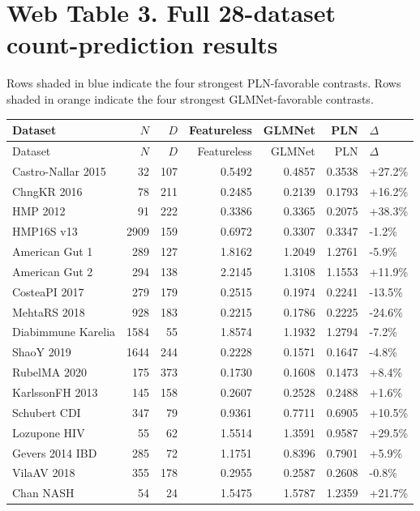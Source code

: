 \documentclass[11pt]{article}
\begin{document}
\section*{Web Table 3. Full 28-dataset count-prediction results}
Rows shaded in blue indicate the four strongest PLN-favorable contrasts.
Rows shaded in orange indicate the four strongest GLMNet-favorable contrasts.
\small
\begin{longtable}{p{}rrrrrp{}}
\toprule
Dataset & $N$ & $D$ & Featureless & GLMNet & PLN & $\Delta$ \\
\midrule
\endfirsthead
\toprule
Dataset & $N$ & $D$ & Featureless & GLMNet & PLN & $\Delta$ \\
\midrule
\endhead
Castro-Nallar 2015 & 32 & 107 & 0.5492 & 0.4857 & 0.3538 & +27.2\% \\
ChngKR 2016 & 78 & 211 & 0.2485 & 0.2139 & 0.1793 & +16.2\% \\
\rowcolor{blue!8} HMP 2012 & 91 & 222 & 0.3386 & 0.3365 & 0.2075 & +38.3\% \\
HMP16S v13 & 2909 & 159 & 0.6972 & 0.3307 & 0.3347 & -1.2\% \\
American Gut 1 & 289 & 127 & 1.8162 & 1.2049 & 1.2761 & -5.9\% \\
American Gut 2 & 294 & 138 & 2.2145 & 1.3108 & 1.1553 & +11.9\% \\
\rowcolor{orange!10} CosteaPI 2017 & 279 & 179 & 0.2515 & 0.1974 & 0.2241 & -13.5\% \\
\rowcolor{orange!10} MehtaRS 2018 & 928 & 183 & 0.2215 & 0.1786 & 0.2225 & -24.6\% \\
\rowcolor{orange!10} Diabimmune Karelia & 1584 & 55 & 1.8574 & 1.1932 & 1.2794 & -7.2\% \\
ShaoY 2019 & 1644 & 244 & 0.2228 & 0.1571 & 0.1647 & -4.8\% \\
RubelMA 2020 & 175 & 373 & 0.1730 & 0.1608 & 0.1473 & +8.4\% \\
KarlssonFH 2013 & 145 & 158 & 0.2607 & 0.2528 & 0.2488 & +1.6\% \\
Schubert CDI & 347 & 79 & 0.9361 & 0.7711 & 0.6905 & +10.5\% \\
\rowcolor{blue!8} Lozupone HIV & 55 & 62 & 1.5514 & 1.3591 & 0.9587 & +29.5\% \\
Gevers 2014 IBD & 285 & 72 & 1.1751 & 0.8396 & 0.7901 & +5.9\% \\
VilaAV 2018 & 355 & 178 & 0.2955 & 0.2587 & 0.2608 & -0.8\% \\
Chan NASH & 54 & 24 & 1.5475 & 1.5787 & 1.2359 & +21.7\% \\

\end{longtable}
\end{document}
